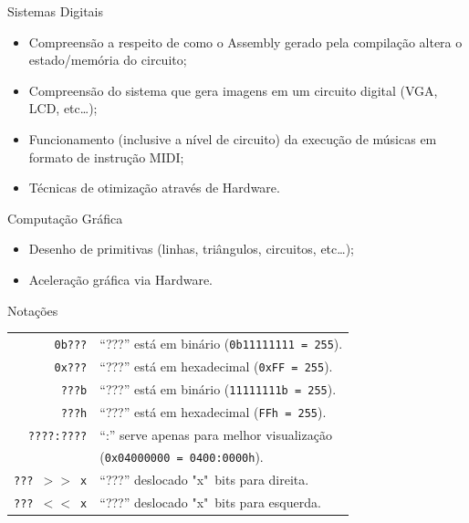 \documentclass{beamer}
\begin{document}
\begin{darkframes}
    \begin{frame}{Sistemas Digitais}
        \begin{itemize}
            \item Compreensão a respeito de como o Assembly gerado pela
                compilação altera o estado/memória do circuito;
            \item Compreensão do sistema que gera imagens em um circuito
                digital (VGA, LCD, etc\ldots);
            \item Funcionamento (inclusive a nível de circuito) da execução de
                músicas em formato de instrução MIDI\@;
            \item Técnicas de otimização através de Hardware.
        \end{itemize}
    \end{frame}

    \begin{frame}{Computação Gráfica}
        \begin{itemize}
            \item Desenho de primitivas (linhas, triângulos, circuitos, etc\ldots);
            \item Aceleração gráfica via Hardware.
        \end{itemize}
    \end{frame}

    \begin{frame}{Notações}
        \begin{center}
            \begin{tabular}{r|l}
                \texttt{0b???}      & \enquote{???} está em binário (\texttt{0b11111111 = 255}).\\
                \texttt{0x???}      & \enquote{???} está em hexadecimal (\texttt{0xFF = 255}).\\
                \texttt{???b}       & \enquote{???} está em binário (\texttt{11111111b = 255}).\\
                \texttt{???h}       & \enquote{???} está em hexadecimal (\texttt{FFh = 255}).\\
                \texttt{????:????}  & \enquote{:} serve apenas para melhor visualização \\
                                    & (\texttt{0x04000000 = 0400:0000h}).\\
                \texttt{??? $>>$ x} & \enquote{???} deslocado "x"\ bits para direita.\\
                \texttt{??? $<<$ x} & \enquote{???} deslocado "x"\ bits para esquerda.\\
            \end{tabular}
        \end{center}
    \end{frame}



\end{darkframes}
\end{document}
